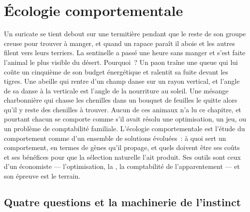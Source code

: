 \chapter{Écologie comportementale}\label{ch:b3:behavioural-ecology}

Un suricate se tient debout sur une termitière pendant que le reste de
son groupe creuse pour trouver à manger, et quand un rapace paraît il
aboie et les autres filent vers leurs terriers. La sentinelle a passé
une heure sans manger et s'est faite l'animal le plus visible du désert.
Pourquoi~? Un paon traîne une queue qui lui coûte un cinquième de son
budget énergétique et ralentit sa fuite devant les tigres. Une abeille
qui rentre d'un champ danse sur un rayon vertical, et l'angle de sa
danse à la verticale est l'angle de la nourriture au soleil. Une mésange
charbonnière qui chasse les chenilles dans un bouquet de feuilles le
quitte alors qu'il y reste des chenilles à trouver. Aucun de ces animaux
n'a lu ce chapitre, et pourtant chacun se comporte comme s'il avait
résolu une optimisation, un jeu, ou un problème de comptabilité
familiale. L'écologie comportementale est l'étude du comportement comme
d'un ensemble de solutions évoluées~: à quoi sert un comportement, en
termes de gènes qu'il propage, et quels doivent être ses coûts et ses
bénéfices pour que la sélection naturelle l'ait produit. Ses outils sont
ceux d'un économiste --- l'optimisation, la , la
comptabilité de l'apparentement --- et son épreuve est le terrain.

\section{Quatre questions et la machinerie de l'instinct}

